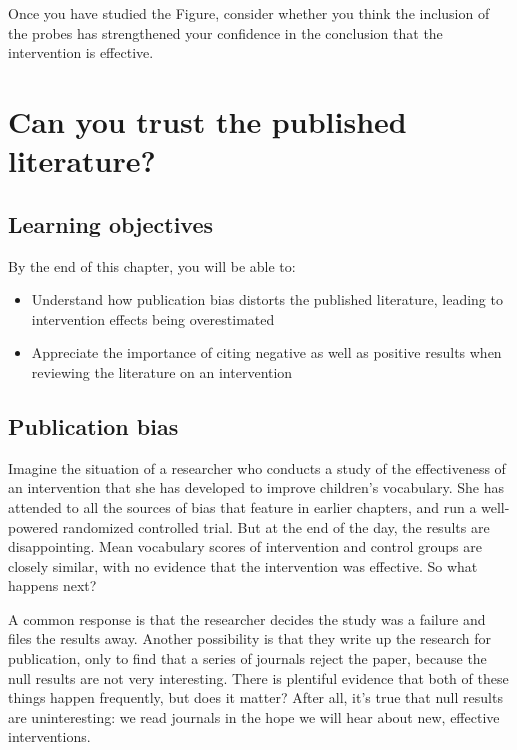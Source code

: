 \documentclass{krantz}
\begin{document}
Once you have studied the Figure, consider whether you think the inclusion of the probes has strengthened your confidence in the conclusion that the intervention is effective.

\hypertarget{pubbias}{%
\chapter{Can you trust the published literature?}\label{pubbias}}

\hypertarget{learning-objectives-19}{%
\section{Learning objectives}\label{learning-objectives-19}}

By the end of this chapter, you will be able to:

\begin{itemize}
\item
  Understand how publication bias distorts the published literature, leading to intervention effects being overestimated
\item
  Appreciate the importance of citing negative as well as positive results when reviewing the literature on an intervention
\end{itemize}

\hypertarget{publication-bias}{%
\section{Publication bias}\label{publication-bias}}

Imagine the situation of a researcher who conducts a study of the effectiveness of an intervention that she has developed to improve children's vocabulary. She has attended to all the sources of bias that feature in earlier chapters, and run a well-powered randomized controlled trial. But at the end of the day, the results are disappointing. Mean vocabulary scores of intervention and control groups are closely similar, with no evidence that the intervention was effective. So what happens next?

A common response is that the researcher decides the study was a failure and files the results away. Another possibility is that they write up the research for publication, only to find that a series of journals reject the paper, because the null results are not very interesting. There is plentiful evidence that both of these things happen frequently, but does it matter? After all, it's true that null results are uninteresting: we read journals in the hope we will hear about new, effective interventions.
\end{document}
